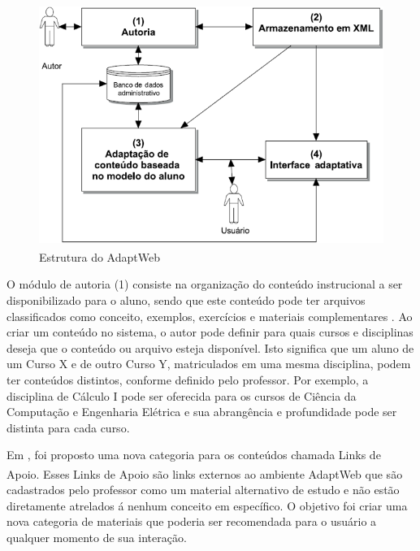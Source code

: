\begin{figure}[htb]
  \caption{\label{fig:adaptweb-arquitetura}Estrutura do AdaptWeb\textsuperscript{\textregistered}}
  \begin{center}
      \includegraphics[scale=1.0]{./Figuras/adaptweb-arquitetura.png}
  \end{center}
\end{figure}

O módulo de autoria (1) consiste na organização do conteúdo instrucional a ser disponibilizado para o aluno, sendo que
este conteúdo pode ter arquivos classificados como conceito, exemplos, exercícios e materiais complementares
\cite{gasparini2003interface}. Ao criar um conteúdo no sistema, o autor pode definir para quais cursos e disciplinas
deseja que o conteúdo ou arquivo esteja disponível. Isto significa que um aluno de um Curso X e de outro Curso Y,
matriculados em uma mesma disciplina, podem ter conteúdos distintos, conforme definido pelo professor. Por exemplo, a
disciplina de Cálculo I pode ser oferecida para os cursos de Ciência da Computação e Engenharia Elétrica e sua
abrangência e profundidade pode ser distinta para cada curso.

Em , foi proposto uma nova categoria para os conteúdos chamada Links de Apoio. Esses Links de Apoio
são links externos ao ambiente AdaptWeb\textsuperscript{\textregistered} que são cadastrados pelo professor como um
material alternativo de estudo e não estão diretamente atrelados á nenhum conceito em específico. O objetivo foi criar
uma nova categoria de materiais que poderia ser recomendada para o usuário a qualquer momento de sua interação.

